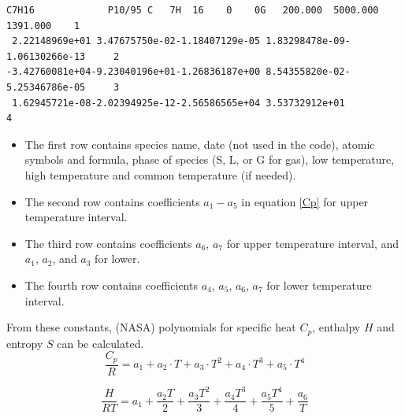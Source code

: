 \documentclass{report}
\begin{document}
\begin{verbatim}
C7H16             P10/95 C   7H  16    0    0G   200.000  5000.000  1391.000    1
 2.22148969e+01 3.47675750e-02-1.18407129e-05 1.83298478e-09-1.06130266e-13     2
-3.42760081e+04-9.23040196e+01-1.26836187e+00 8.54355820e-02-5.25346786e-05     3
 1.62945721e-08-2.02394925e-12-2.56586565e+04 3.53732912e+01                    4
\end{verbatim}
\begin{itemize}
\item The first row contains species name, date (not used in the code), atomic symbols and formula, phase of species (S, L, or G for gas), low temperature, high temperature and common temperature (if needed).
\item The second row contains coefficients $a_{1}-a_{5}$ in equation \ref{Cp} for upper temperature interval.
\item The third row contains coefficients $a_{6}$, $a_{7}$ for upper temperature interval, and $a_{1}$, $a_{2}$, and $a_{3}$ for lower.

\item The fourth row contains coefficients $a_{4}$, $a_{5}$, $a_{6}$, $a_{7}$ for lower temperature interval.
\end{itemize}
From these constants, (NASA) polynomials for specific heat $C_{p}$, enthalpy $H$ and entropy $S$ can be calculated.
\begin{equation}
\label{Cp}
 	\frac{C_{p}} {R} = a_{1}+a_{2} \cdot T +a_{3} \cdot T^{2}+a_{4} \cdot T^{3}+a_{5} \cdot T^{4}
\end{equation} 

\begin{equation}
\label{H}
 	\frac{H}{RT} = a_1 + \frac{a_2 T}{2} + \frac{a_3 T^2} {3} + \frac{a_4 T^3}{4} + \frac{a_5 T^4}{5} + \frac{a_6}{T}
\end{equation} 
\end{document}
